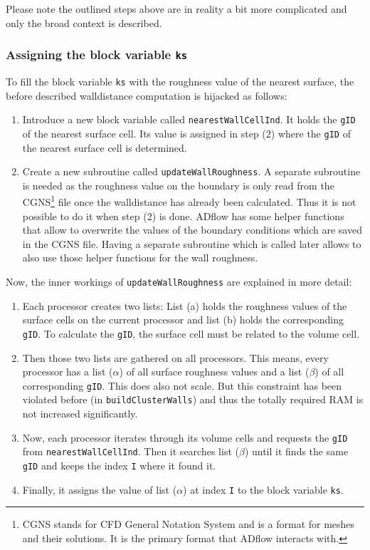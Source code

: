 \noindent Please note the outlined steps above are in reality a bit more
complicated and only the broad context is described.


\subsubsection{Assigning the block variable \texttt{ks}}
\label{subsubsec:propagate_ks}
To fill the block variable \texttt{ks} with the roughness value of the nearest
surface, the before described walldistance computation is hijacked as follows:

\begin{enumerate}[label=\Alph*]
  \item Introduce a new block variable called \texttt{nearestWallCellInd}. It
holds the \texttt{gID} of the nearest surface cell. Its value is assigned in
step (2) where the \texttt{gID} of the nearest surface cell is determined.

  \item Create a new subroutine called \texttt{updateWallRoughness}. A separate
subroutine is needed as the roughness value on the boundary is only read from
the CGNS\footnote{CGNS stands for CFD General Notation System and is a format
for meshes and their solutions. It is the primary format that ADflow interacts
with.} file once the walldistance has already been calculated. Thus it is not
possible to do it when step (2) is done. ADflow has some helper functions that
allow to overwrite the values of the boundary conditions which are saved in the
CGNS file. Having a separate subroutine which is called later allows to also use
those helper functions for the wall roughness.
\end{enumerate}

\noindent Now, the inner workings of \texttt{updateWallRoughness} are explained
in more detail:

\begin{enumerate}[label=\Alph*]
  \item Each processor creates two lists: List (a) holds the roughness values of
the surface cells on the current processor and list (b) holds the corresponding
\texttt{gID}. To calculate the \texttt{gID}, the surface cell must be related to
the volume cell.

  \item Then those two lists are gathered on all processors. This means, every
processor has a list ($\alpha$) of all surface roughness values and a list
($\beta$) of all corresponding \texttt{gID}. This does also not scale. But this
constraint has been violated before (in \texttt{buildClusterWalls}) and thus the
totally required RAM is not increased significantly.

\item Now, each processor iterates through its volume cells and requests the
\texttt{gID} from \texttt{nearestWallCellInd}. Then it searches list ($\beta$)
until it finds the same \texttt{gID} and keeps the index \texttt{I} where
it found it.

\item Finally, it assigns the value of list ($\alpha$) at index \texttt{I} to the
block variable \texttt{ks}.
\end{enumerate}

